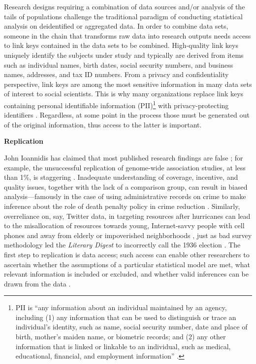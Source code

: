 \documentclass[]{krantz}
\begin{document}
Research designs requiring a combination of data sources and/or analysis
of the tails of populations challenge the traditional paradigm of
conducting statistical analysis on deidentified or aggregated data. In
order to combine data sets, someone in the chain that transforms raw
data into research outputs needs access to link keys contained in the
data sets to be combined. High-quality link keys uniquely identify the
subjects under study and typically are derived from items such as
individual names, birth dates, social security numbers, and business
names, addresses, and tax ID numbers. From a privacy and confidentiality
perspective, link keys are among the most sensitive information in many
data sets of interest to social scientists. This is why many
organizations replace link keys containing personal identifiable
information (PII)\footnote{PII is ``any information about an individual
  maintained by an agency, including (1) any information that can be
  used to distinguish or trace an individual's identity, such as name,
  social security number, date and place of birth, mother's maiden name,
  or biometric records; and (2) any other information that is linked or
  linkable to an individual, such as medical, educational, financial,
  and employment information'' \citep{mccallister2010sp}.} with
privacy-protecting identifiers \citep{schnell2009privacy}. Regardless,
at some point in the process those must be generated out of the original
information, thus access to the latter is important.

\textbf{Replication}

John Ioannidis has claimed that most published research findings are
false \citep{Ioannidis2005}; for example, the unsuccessful replication
of genome-wide association studies, at less than 1\%, is staggering
\citep{Bastian2013}. Inadequate understanding of coverage, incentive,
and quality issues, together with the lack of a comparison group, can
result in biased analysis---famously in the case of using administrative
records on crime to make inference about the role of death penalty
policy in crime reduction \citep{donohue2006uses, levitt2006economic}.
Similarly, overreliance on, say, Twitter data, in targeting resources
after hurricanes can lead to the misallocation of resources towards
young, Internet-savvy people with cell phones and away from elderly or
impoverished neighborhoods \citep{shelton2014mapping}, just as bad
survey methodology led the \emph{Literary Digest} to incorrectly call
the 1936 election \citep{squire19881936}. The first step to replication
is data access; such access can enable other researchers to ascertain
whether the assumptions of a particular statistical model are met, what
relevant information is included or excluded, and whether valid
inferences can be drawn from the data \citep{kreuter201412}.
\end{document}
